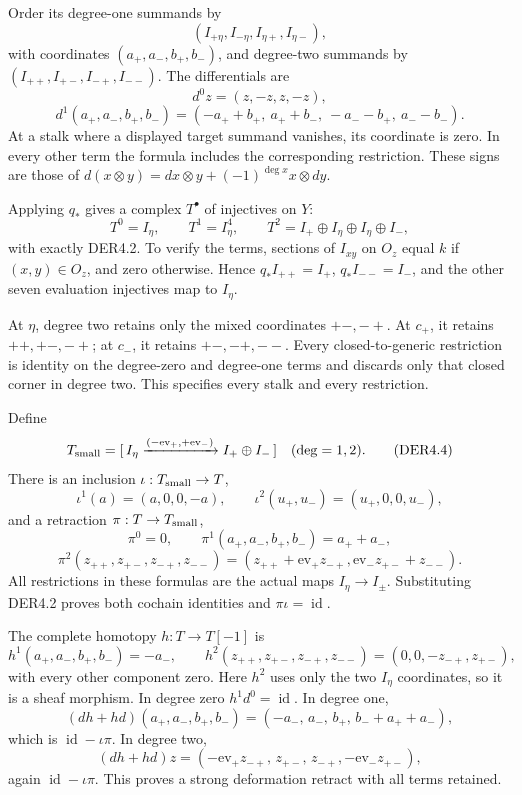 Order its degree-one summands by \[
(I_{+\eta},I_{-\eta},I_{\eta+},I_{\eta-}),
\] with coordinates \((a_+,a_-,b_+,b_-)\), and degree-two summands by
\((I_{++},I_{+-},I_{-+},I_{--})\). The differentials are \[
d^0z=(z,-z,z,-z),
\] \[
d^1(a_+,a_-,b_+,b_-)
=(-a_++b_+,\ a_++b_-,\ -a_--b_+,\ a_--b_-).
\tag{DER4.2}
\] At a stalk where a displayed target summand vanishes, its coordinate
is zero. In every other term the formula includes the corresponding
restriction. These signs are those of
\(d(x\otimes y)=dx\otimes y+(-1)^{\deg x}x\otimes dy\).

Applying \(q_*\) gives a complex \(T^\bullet\) of injectives on \(Y\):
\[
T^0=I_\eta,\qquad T^1=I_\eta^4,\qquad
T^2=I_+\oplus I_\eta\oplus I_\eta\oplus I_-,
\tag{DER4.3}
\] with exactly DER4.2. To verify the terms, sections of \(I_{xy}\) on
\(O_z\) equal \(k\) if \((x,y)\in O_z\), and zero otherwise. Hence
\(q_*I_{++}=I_+\), \(q_*I_{--}=I_-\), and the other seven evaluation
injectives map to \(I_\eta\).

At \(\eta\), degree two retains only the mixed coordinates \(+-,-+\). At
\(c_+\), it retains \(++,+-,-+\); at \(c_-\), it retains \(+-,-+,--\).
Every closed-to-generic restriction is identity on the degree-zero and
degree-one terms and discards only that closed corner in degree two.
This specifies every stalk and every restriction.

Define \[
T_{\rm small}
=[\,I_\eta\xrightarrow{(-\mathrm{ev}_+,+\mathrm{ev}_-)}
      I_+\oplus I_-\,]\quad(\deg=1,2).
\tag{DER4.4}
\] There is an inclusion \(\iota:T_{\rm small}\to T\), \[
\iota^1(a)=(a,0,0,-a),\qquad
\iota^2(u_+,u_-)=(u_+,0,0,u_-),
\tag{DER4.5}
\] and a retraction \(\pi:T\to T_{\rm small}\), \[
\pi^0=0,\qquad
\pi^1(a_+,a_-,b_+,b_-)=a_++a_-,
\] \[
\pi^2(z_{++},z_{+-},z_{-+},z_{--})
=(z_{++}+\mathrm{ev}_+z_{-+},
  \mathrm{ev}_-z_{+-}+z_{--}).
\tag{DER4.6}
\] All restrictions in these formulas are the actual maps
\(I_\eta\to I_\pm\). Substituting DER4.2 proves both cochain identities
and \(\pi\iota=\operatorname{id}\).

The complete homotopy \(h:T\to T[-1]\) is \[
h^1(a_+,a_-,b_+,b_-)=-a_-,\qquad
h^2(z_{++},z_{+-},z_{-+},z_{--})=(0,0,-z_{-+},z_{+-}),
\tag{DER4.7}
\] with every other component zero. Here \(h^2\) uses only the two
\(I_\eta\) coordinates, so it is a sheaf morphism. In degree zero
\(h^1d^0=\operatorname{id}\). In degree one, \[
(dh+hd)(a_+,a_-,b_+,b_-)
=(-a_-,\,a_-,\,b_+,\,b_-+a_++a_-),
\] which is \(\operatorname{id}-\iota\pi\). In degree two, \[
(dh+hd)z=(-\mathrm{ev}_+z_{-+},\,z_{+-},\,z_{-+},
          -\mathrm{ev}_-z_{+-}),
\] again \(\operatorname{id}-\iota\pi\). This proves a strong
deformation retract with all terms retained.

